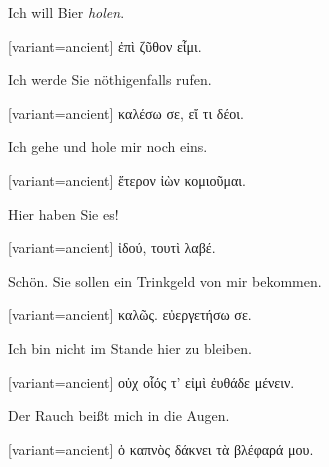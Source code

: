 Ich will Bier \emph{holen}.

\switchcolumn

\begin{greek}[variant=ancient]%
ἐπὶ ζῦθον εἶμι.

\end{greek}%
\switchcolumn*

Ich werde Sie nöthigenfalls rufen.

\switchcolumn

\begin{greek}[variant=ancient]%
καλέσω σε, εἴ τι δέοι.

\end{greek}%
\switchcolumn*

Ich gehe und hole mir noch eins.

\switchcolumn

\begin{greek}[variant=ancient]%
ἕτερον ἰὼν κομιοῦμαι.

\end{greek}%
\switchcolumn*

Hier haben Sie es!

\switchcolumn

\begin{greek}[variant=ancient]%
ἰδού, τουτὶ λαβέ.

\end{greek}%
\switchcolumn*

Schön. Sie sollen ein Trinkgeld von mir bekommen.

\switchcolumn

\begin{greek}[variant=ancient]%
καλῶς. εὐεργετήσω σε.

\end{greek}%
\switchcolumn*

Ich bin nicht im Stande hier zu bleiben.

\switchcolumn

\begin{greek}[variant=ancient]%
οὐχ οἷός τ' εἰμὶ ἐυθάδε μένειν.

\end{greek}%
\switchcolumn*

Der Rauch beißt mich in die Augen.

\switchcolumn

\begin{greek}[variant=ancient]%
ὁ καπνὸς δάκνει τὰ βλέφαρά μου.

\end{greek}%
\switchcolumn*

